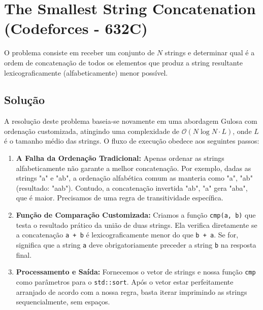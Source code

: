 \documentclass[12pt,a4paper]{article}
\begin{document}
\newpage

\section{The Smallest String Concatenation (Codeforces - 632C)}
O problema consiste em receber um conjunto de $N$ strings e determinar qual é a ordem de concatenação de todos os elementos que produz a string resultante lexicograficamente (alfabeticamente) menor possível.

\subsection{Solução}
A resolução deste problema baseia-se novamente em uma abordagem Gulosa com ordenação customizada, atingindo uma complexidade de $\mathcal{O}(N \log N \cdot L)$, onde $L$ é o tamanho médio das strings. O fluxo de execução obedece aos seguintes passos:

\begin{enumerate}
    \item \textbf{A Falha da Ordenação Tradicional:} Apenas ordenar as strings alfabeticamente não garante a melhor concatenação. Por exemplo, dadas as strings "a" e "ab", a ordenação alfabética comum as manteria como "a", "ab" (resultado: "aab"). Contudo, a concatenação invertida "ab", "a" gera "aba", que é maior. Precisamos de uma regra de transitividade específica.
    \item \textbf{Função de Comparação Customizada:} Criamos a função \texttt{cmp(a, b)} que testa o resultado prático da união de duas strings. Ela verifica diretamente se a concatenação \texttt{a + b} é lexicograficamente menor do que \texttt{b + a}. Se for, significa que a string \texttt{a} deve obrigatoriamente preceder a string \texttt{b} na resposta final.
    \item \textbf{Processamento e Saída:} Fornecemos o vetor de strings e nossa função \texttt{cmp} como parâmetros para o \texttt{std::sort}. Após o vetor estar perfeitamente arranjado de acordo com a nossa regra, basta iterar imprimindo as strings sequencialmente, sem espaços.
\end{enumerate}
\end{document}
